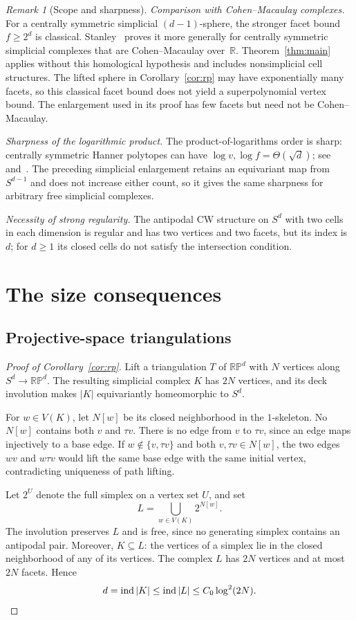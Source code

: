 \documentclass[11pt]{article}
\theoremstyle{remark}
\newtheorem{remark}[theorem]{Remark}
\DeclareMathOperator{\ind}{ind}
\newcommand{\R}{\mathbb R}
\newcommand{\RP}{\mathbb {RP}}
\newcommand{\Czero}{C_0}
\begin{document}
\begin{remark}[Scope and sharpness]
\emph{Comparison with Cohen--Macaulay complexes.}
For a centrally symmetric simplicial $(d-1)$-sphere, the stronger
facet bound $f\geq2^d$ is classical. Stanley~\cite[Theorem~3.1]{Stanley} proves it more generally
for centrally symmetric simplicial complexes that are Cohen--Macaulay
over~$\R$. Theorem~\ref{thm:main} applies without this
homological hypothesis and includes nonsimplicial cell structures.
The lifted sphere in Corollary~\ref{cor:rp} may have exponentially many
facets, so this classical facet bound does not yield a superpolynomial
vertex bound. The enlargement used in its proof has few facets but need not be Cohen--Macaulay.

\smallskip
\noindent\emph{Sharpness of the logarithmic product.}
The product-of-logarithms order is sharp:
centrally symmetric Hanner polytopes can have
$\log v,\log f=\Theta(\sqrt d)$; see~\cite{FLM} and~\cite[Proposition~4.1]{Milo}.
The preceding simplicial enlargement retains an equivariant map from
$S^{d-1}$ and does not increase either count, so it gives the same
sharpness for arbitrary free simplicial complexes.

\smallskip
\noindent\emph{Necessity of strong regularity.}
The antipodal CW structure on $S^d$
with two cells in each dimension is regular and has two vertices and
two facets, but its index is $d$; for $d\geq1$ its closed cells do not
satisfy the intersection condition.
\end{remark}

\section{The size consequences}

\subsection{Projective-space triangulations}\label{subsection:triangulations}

\begin{proof}[Proof of Corollary~\ref{cor:rp}]
Lift a triangulation $T$ of $\RP^d$ with $N$ vertices along
$S^d\to\RP^d$. The resulting simplicial complex $K$ has $2N$ vertices,
and its deck involution makes $|K|$ equivariantly homeomorphic to $S^d$.

For $w\in V(K)$, let $N[w]$ be its closed neighborhood in the
$1$-skeleton. No $N[w]$ contains both $v$ and $\tau v$.
There is no edge from $v$ to $\tau v$, since an edge maps injectively
to a base edge. If $w\notin\{v,\tau v\}$ and both $v,\tau v\in N[w]$,
the two edges $wv$ and $w\tau v$ would lift the same base edge with
the same initial vertex, contradicting uniqueness of path lifting.

Let $2^U$ denote the full simplex on a vertex set $U$, and set
\[
 L=\bigcup_{w\in V(K)}2^{N[w]}.
\]
The involution preserves $L$ and is free, since no generating simplex
contains an antipodal pair. Moreover, $K\subseteq L$: the vertices
of a simplex lie in the closed neighborhood of any of its vertices.
The complex $L$ has $2N$ vertices and at most $2N$ facets. Hence
\[
 d=\ind|K|\leq\ind|L|\leq\Czero\log^2(2N). \qedhere
\]
\end{proof}
\end{document}
